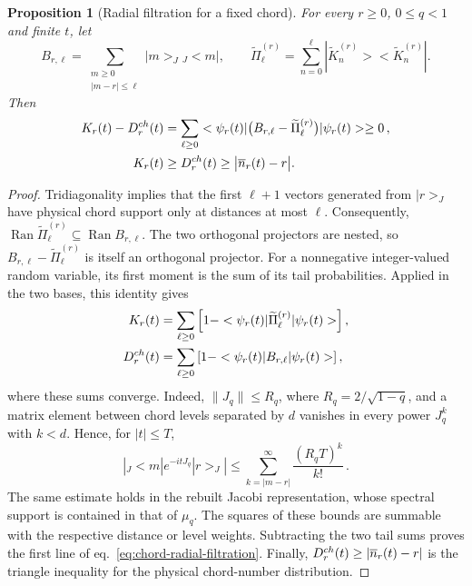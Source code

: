 \documentclass[10pt,a4paper]{amsart}
\newtheorem{proposition}{Proposition}
\def\Jac{J}%
\def\bra#1{<#1|}%
\def\ee{e}%
\def\ii{i}%
\def\ket#1{|#1>}%
\begin{document}
\begin{proposition}[Radial filtration for a fixed chord]
\label{prop:chord-radial-filtration}
For every $r\ge0$, $0\le q<1$ and finite $t$, let
\begin{equation}
   B_{r,\ell}=\sum_{\substack{m\ge0\\ |m-r|\le\ell}}
      \ket m_{\Jac}{}_{\Jac}\!\bra m,
   \qquad
   \widetilde\Pi_{\ell}^{(r)}=
      \sum_{n=0}^{\ell}\ket{\widetilde K_n^{(r)}}
      \bra{\widetilde K_n^{(r)}}.
   \label{eq:chord-radial-projectors}
\end{equation}
Then
\begin{equation}
\begin{aligned}
   K_r(t)-D_r^{\rm ch}(t)
   &=\sum_{\ell\ge0}\bra{\psi_r(t)}
     \bigl(B_{r,\ell}-\widetilde\Pi_{\ell}^{(r)}\bigr)
     \ket{\psi_r(t)}\ge0\,,\\
   K_r(t)&\ge D_r^{\rm ch}(t)\ge
      \bigl|\overline n_r(t)-r\bigr|.
   \label{eq:chord-radial-filtration}
\end{aligned}
\end{equation}
\end{proposition}

\begin{proof}
Tridiagonality implies that the first $\ell+1$ vectors generated from
$\ket r_{\Jac}$ have physical chord support only at distances at most $\ell$.
Consequently,
$\operatorname{Ran}\widetilde\Pi_{\ell}^{(r)}\subseteq
\operatorname{Ran}B_{r,\ell}$.  The two orthogonal projectors are nested, so
$B_{r,\ell}-\widetilde\Pi_{\ell}^{(r)}$ is itself an orthogonal projector.
For a nonnegative integer-valued random variable, its first moment is the sum of its
tail probabilities.  Applied in the two bases, this identity gives
\begin{equation}
\begin{aligned}
 K_r(t)&=\sum_{\ell\ge0}
 \left[1-\bra{\psi_r(t)}\widetilde\Pi_{\ell}^{(r)}\ket{\psi_r(t)}\right],\\
 D_r^{\rm ch}(t)&=\sum_{\ell\ge0}
 \left[1-\bra{\psi_r(t)}B_{r,\ell}\ket{\psi_r(t)}\right],
\end{aligned}
\end{equation}
where these sums converge.  Indeed,
$\|\Jac_q\|\le R_q$, where $R_q=2/\sqrt{1-q}$, and a matrix element between chord
levels separated by $d$ vanishes in every power $\Jac_q^k$ with $k<d$.
Hence, for $|t|\le T$,
\begin{equation}
 \left|{}_{\Jac}\!\bra m\ee^{-\ii t\Jac_q}\ket r_{\Jac}\right|
 \le \sum_{k=|m-r|}^{\infty}\frac{(R_qT)^k}{k!}\,.
\end{equation}
The same estimate holds in the rebuilt Jacobi representation, whose spectral support is
contained in that of $\mu_q$.  The squares of these bounds are summable with the respective
distance or level weights.  Subtracting the two tail sums proves the first line of
eq.~\eqref{eq:chord-radial-filtration}.  Finally,
$D_r^{\rm ch}(t)\ge|\overline n_r(t)-r|$ is the triangle inequality for the
physical chord-number distribution.
\end{proof}
\end{document}
